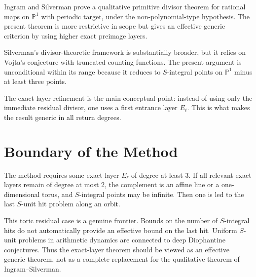 \documentclass[11pt]{article}
\begin{document}
Ingram and Silverman prove a qualitative primitive divisor theorem for rational maps on \(\mathbb P^1\) with periodic target, under the non-polynomial-type hypothesis. The present theorem is more restrictive in scope but gives an effective generic criterion by using higher exact preimage layers.

Silverman's divisor-theoretic framework is substantially broader, but it relies on Vojta's conjecture with truncated counting functions. The present argument is unconditional within its range because it reduces to \(S\)-integral points on \(\mathbb P^1\) minus at least three points.

The exact-layer refinement is the main conceptual point: instead of using only the immediate residual divisor, one uses a first entrance layer \(E_\ell\). This is what makes the result generic in all return degrees.

\section{Boundary of the Method}

The method requires some exact layer \(E_\ell\) of degree at least \(3\). If all relevant exact layers remain of degree at most \(2\), the complement is an affine line or a one-dimensional torus, and \(S\)-integral points may be infinite. Then one is led to the last \(S\)-unit hit problem along an orbit.

This toric residual case is a genuine frontier. Bounds on the number of \(S\)-integral hits do not automatically provide an effective bound on the last hit. Uniform \(S\)-unit problems in arithmetic dynamics are connected to deep Diophantine conjectures. Thus the exact-layer theorem should be viewed as an effective generic theorem, not as a complete replacement for the qualitative theorem of Ingram--Silverman.
\end{document}
